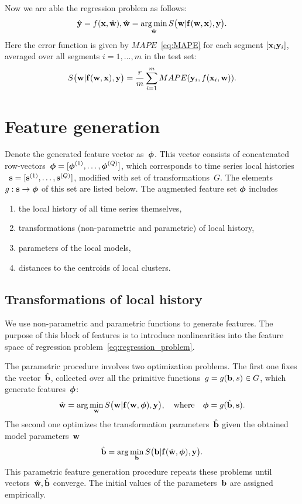 \documentclass[conference]{IEEEtran}
\begin{document}
Now we are able the regression problem as follows:
\begin{equation}\label{eq:regression_problem}
\hat{\y} = f(\x, \hat{\w}), \hat{\w} = \argmin_{\hat{\w}}S\bigl(\bw|\fx(\bw,\bx),\by\bigr). %
\end{equation}
Here the error function is given by $MAPE$~\eqref{eq:MAPE} for each segment $[{\mathbf{x}}_i {\mathbf{y}}_i]$, averaged over all segments $i = 1, \dots, m$ in the test set:
\[ S\bigl(\mathbf{w}|{\mathbf{f}}(\mathbf{w},{\mathbf{x}}),{\mathbf{y}}\bigr) = \frac{r}{m}\sum_{i=1}^{m} MAPE({\mathbf{y}}_i, f({\mathbf{x}}_i, {\mathbf{w}})).\]

\section{Feature generation}
Denote the generated feature vector as~${\boldsymbol{\phi}}$. This vector consists of concatenated row-vectors~${\boldsymbol{\phi}}=[{\boldsymbol{\phi}}^{(1)},\dots,{\boldsymbol{\phi}}^{(Q)}]$, which corresponds to time series local histories ~${\mathbf{s}}=[{\mathbf{s}}^{(1)},\dots,{\mathbf{s}}^{(Q)}]$, modified with set of transformations~$G$. The elements~$g:{\mathbf{s}}\to{\boldsymbol{\phi}}$ of this set are listed below. The augmented feature set ${\boldsymbol{\phi}}$ includes
\begin{enumerate}[1)]
\item the local history of all time series themselves,
\item transformations (non-parametric and parametric) of local history,
\item parameters of the local models,
\item distances to the centroids of local clusters.
\end{enumerate}



\subsection{Transformations of local history}
We use non-parametric and parametric functions to generate features. The purpose of this block of features is to introduce nonlinearities into the feature space of regression problem~\eqref{eq:regression_problem}.

The parametric procedure involves two optimization problems. The first one fixes the vector~$\hat{{\mathbf{b}}}$, collected over all the primitive functions~$g=g({\mathbf{b}},s) \in G$, which generate features~${\boldsymbol{\phi}}$:
\[
\hat{\mathbf{w}} = \arg\min_{\mathbf{w}} S\bigl(\mathbf{w}|{\mathbf{f}}(\mathbf{w},{\boldsymbol{\phi}}),{\mathbf{y}}\bigr),\quad
\text{where}
\quad {\boldsymbol{\phi}} = g(\hat{{\mathbf{b}}},{\mathbf{s}}).
\]
The second one optimizes the transformation parameters~$\hat{{\mathbf{b}}}$ given the obtained model parameters~$\mathbf{w}$
\[
\hat{{\mathbf{b}}} = \arg\min_{{\mathbf{b}}} S\bigl({\mathbf{b}}|{\mathbf{f}}(\hat{\mathbf{w}},{\boldsymbol{\phi}}),{\mathbf{y}}\bigr).
\]
This parametric feature generation procedure repeats these problems until vectors~$\hat{\mathbf{w}},\hat{{\mathbf{b}}}$ converge. The initial values of the parameters~${\mathbf{b}}$ are assigned empirically.
\end{document}
